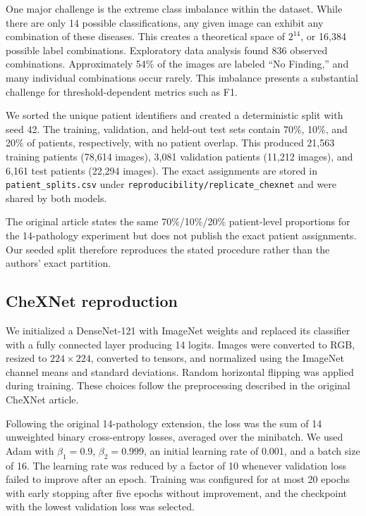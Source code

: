 One major challenge is the extreme class imbalance within the dataset. While
there are only 14 possible classifications, any given image can exhibit any
combination of these diseases. This creates a theoretical space of $2^{14}$,
or 16,384 possible label combinations. Exploratory data analysis found 836
observed combinations. Approximately 54\% of the images are labeled ``No
Finding,'' and many individual combinations occur rarely. This imbalance
presents a substantial challenge for threshold-dependent metrics such as F1.

We sorted the unique patient identifiers and created a deterministic split
with seed 42. The training, validation, and held-out test sets contain 70\%,
10\%, and 20\% of patients, respectively, with no patient overlap. This
produced 21,563 training patients (78,614 images), 3,081 validation patients
(11,212 images), and 6,161 test patients (22,294 images). The exact assignments
are stored in \texttt{patient\_splits.csv} under
\texttt{reproducibility/replicate\_chexnet} and were shared by both models.

The original article states the same 70\%/10\%/20\% patient-level proportions
for the 14-pathology experiment but does not publish the exact patient
assignments. Our seeded split therefore reproduces the stated procedure rather
than the authors' exact partition.

\subsection{CheXNet reproduction}

We initialized a DenseNet-121 with ImageNet weights and replaced its classifier
with a fully connected layer producing 14 logits. Images were converted to
RGB, resized to $224\times224$, converted to tensors, and normalized using the
ImageNet channel means and standard deviations. Random horizontal flipping was
applied during training. These choices follow the preprocessing described in
the original CheXNet article.

Following the original 14-pathology extension, the loss was the sum of 14
unweighted binary cross-entropy losses, averaged over the minibatch. We used
Adam with $\beta_1=0.9$, $\beta_2=0.999$, an initial learning rate of 0.001,
and a batch size of 16. The learning rate was reduced by a factor of 10 whenever
validation loss failed to improve after an epoch. Training was configured for
at most 20 epochs with early stopping after five epochs without improvement,
and the checkpoint with the lowest validation loss was selected.

